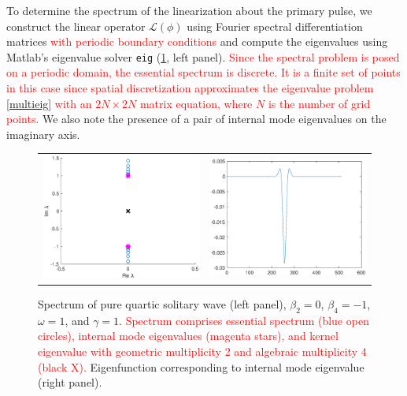 \documentclass[12pt]{elsarticle}
\def\calL{{\mathcal L}}
\newcommand{\revised}[1]{ \textcolor{red}{#1} }
\begin{document}
To determine the spectrum of the linearization about the primary pulse, we construct the linear operator $\calL(\phi)$ using Fourier spectral differentiation matrices \revised{with periodic boundary conditions} and compute the eigenvalues using Matlab's eigenvalue solver \texttt{eig} (\cref{fig:PQSspec}, left panel). \revised{Since the spectral problem is posed on a periodic domain, the essential spectrum is discrete. It is a finite set of points in this case since spatial discretization approximates the eigenvalue problem \cref{multieig} with an $2N \times 2N$ matrix equation, where $N$ is the number of grid points.} We also note the presence of a pair of internal mode eigenvalues on the imaginary axis.  

\begin{figure}[H]
\centering
\begin{tabular}{cc}
\includegraphics[width=8cm]{images/PQSspec.eps} &
\includegraphics[width=8cm]{images/PQSinternalmode.eps}
\end{tabular}
\caption{Spectrum of pure quartic solitary wave (left panel), $\beta_2 = 0$, $\beta_4 = -1$, $\omega = 1$, and $\gamma = 1$. \revised{Spectrum comprises essential spectrum (blue open circles), internal mode eigenvalues (magenta stars), and kernel eigenvalue with geometric multiplicity 2 and algebraic multiplicity 4 (black X).} Eigenfunction corresponding to internal mode eigenvalue (right panel).}
\label{fig:PQSspec}
\end{figure} 
\end{document}
